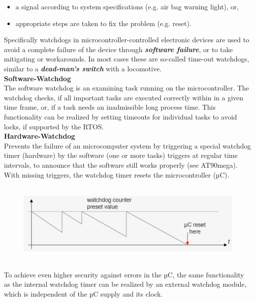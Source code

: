 \begin{itemize}
\item  a signal according to system specifications (e.g. air bag warning light), or, 
\item  appropriate steps are taken to fix the problem (e.g. reset).
\end{itemize}

Specifically watchdogs in microcontroller-controlled electronic devices are used to avoid a complete failure of the device through \textbf{\textit{software failure}}, or to take mitigating or workarounds. In most cases these are so-called time-out watchdogs, similar to a \textbf{\textit{dead-man's switch}} with a locomotive.\\

{\rot\bf Software-Watchdog}\\

The software watchdog is an examining task running on the microcontroller. The watchdog checks, if all important tasks are executed correctly within in a given time frame, or, if a task needs an inadmissible long process time. This functionality can be realized by setting timeouts for individual tasks to avoid locks, if supported by the RTOS.\\

{\rot\bf Hardware-Watchdog}\\

Prevents the failure of an microcomputer system by triggering a special watchdog timer (hardware) by the software (one or more tasks) triggers at regular time intervals, to announce that the software still works properly (see AT90mega). With missing triggers, the watchdog timer resets the microcontroller (µC).

    \begin{figure}[h]
    \centering
    \includegraphics[width=12cm, height=4cm]{Images/image164.png}
    \label{fig:Fig 117}
    \end{figure}

To achieve even higher security against errors in the µC, the same functionality as the internal watchdog timer can be realized by an external watchdog module, which is independent of the µC supply and its clock. \\

